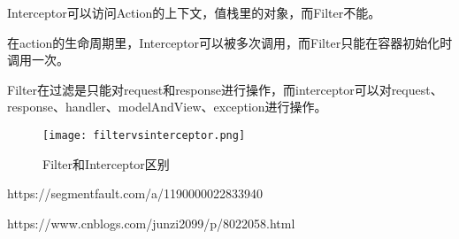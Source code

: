 \documentclass[../../../interview-questions.tex]{subfiles}
\begin{document}
Interceptor可以访问Action的上下文，值栈里的对象，而Filter不能。

在action的生命周期里，Interceptor可以被多次调用，而Filter只能在容器初始化时调用一次。

Filter在过滤是只能对request和response进行操作，而interceptor可以对request、response、handler、modelAndView、exception进行操作。

\begin{figure}[htbp]
	\centering
	\texttt{[image: filtervsinterceptor.png]}
	\caption{Filter和Interceptor区别}
	\label{fig:filtervsinterceptor}
\end{figure}


https://segmentfault.com/a/1190000022833940

https://www.cnblogs.com/junzi2099/p/8022058.html
\end{document}
